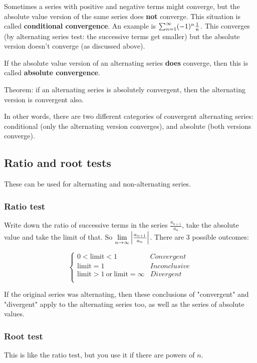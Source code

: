 Sometimes a series with positive and negative terms might converge, but the absolute value version of the same series does \textbf{not} converge. This situation is called \textbf{conditional convergence}. An example is $\sum_{n=1}^{\infty} (-1)^n \frac{1}{n}$. This converges (by alternating series test: the successive terms get smaller) but the absolute version doesn't converge (as discussed above).

If the absolute value version of an alternating series \textbf{does} converge, then this is called \textbf{absolute convergence}.

Theorem: if an alternating series is absolutely convergent, then the alternating version is convergent also.

In other words, there are two different categories of convergent alternating series: conditional (only the alternating version converges), and absolute (both versions converge).

\subsection{Ratio and root tests}

These can be used for alternating and non-alternating series.

\subsubsection{Ratio test}
Write down the ratio of successive terms in the series $\frac{a_{n+1}}{a_n}$, take the absolute value and take the limit of that. So $\lim\limits_{n \to \infty} \Big|\frac{a_{n+1}}{a_n}\Big|$. There are 3 possible outcomes:

$$
\begin{cases}
0 < \text{limit} < 1&Convergent\\
\text{limit} = 1&Inconclusive\\
\text{limit} > 1 ~\text{or}~ \text{limit} = \infty&Divergent\\
\end{cases}
$$

If the original series was alternating, then these conclusions of "convergent" and "divergent" apply to the alternating series too, as well as the series of absolute values.


\subsubsection{Root test}
This is like the ratio test, but you use it if there are powers of $n$.

